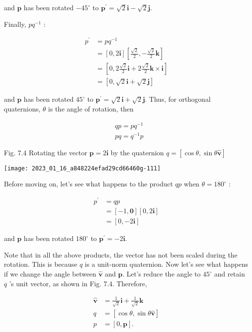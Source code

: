 and $\mathbf{p}$ has been rotated $-45^{\circ}$ to $\mathbf{p}^{\prime}=\sqrt{2} \mathbf{i}-\sqrt{2} \mathbf{j}$.

Finally, $p q^{-1}$ :

$$
\begin{aligned}
p^{\prime} & =p q^{-1} \\
& =[0,2 \mathbf{i}]\left[\frac{\sqrt{2}}{2},-\frac{\sqrt{2}}{2} \mathbf{k}\right] \\
& =\left[0,2 \frac{\sqrt{2}}{2} \mathbf{i}+2 \frac{\sqrt{2}}{2} \mathbf{k} \times \mathbf{i}\right] \\
& =[0, \sqrt{2} \mathbf{i}+\sqrt{2} \mathbf{j}]
\end{aligned}
$$

and $\mathbf{p}$ has been rotated $45^{\circ}$ to $\mathbf{p}^{\prime}=\sqrt{2} \mathbf{i}+\sqrt{2} \mathbf{j}$. Thus, for orthogonal quaternions, $\theta$ is the angle of rotation, then

$$
\begin{aligned}
& q p=p q^{-1} \\
& p q=q^{-1} p
\end{aligned}
$$

Fig. 7.4 Rotating the vector $\mathbf{p}=2 \mathbf{i}$ by the quaternion $q=[\cos \theta, \sin \theta \hat{\mathbf{v}}]$

\begin{center}
\texttt{[image: 2023\_01\_16\_a848224efad29cd66460g-111]}
\end{center}

Before moving on, let's see what happens to the product $q p$ when $\theta=180^{\circ}$ :

$$
\begin{aligned}
p^{\prime} & =q p \\
& =[-1, \mathbf{0}][0,2 \mathbf{i}] \\
& =[0,-2 \mathbf{i}]
\end{aligned}
$$

and $\mathbf{p}$ has been rotated $180^{\circ}$ to $\mathbf{p}^{\prime}=-2 \mathbf{i}$.

Note that in all the above products, the vector has not been scaled during the rotation. This is because $q$ is a unit-norm quaternion. Now let's see what happens if we change the angle between $\hat{\mathbf{v}}$ and $\mathbf{p}$. Let's reduce the angle to $45^{\circ}$ and retain $q$ 's unit vector, as shown in Fig. 7.4. Therefore,

$$
\begin{aligned}
\hat{\mathbf{v}} & =\frac{1}{\sqrt{2}} \mathbf{i}+\frac{1}{\sqrt{2}} \mathbf{k} \\
q & =[\cos \theta, \sin \theta \hat{\mathbf{v}}] \\
p & =[0, \mathbf{p}] .
\end{aligned}
$$

